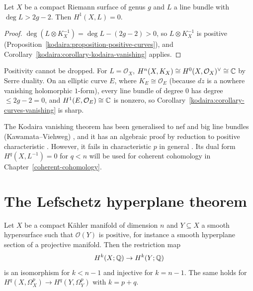 \begin{corollary}\label{kodaira:corollary-curves-vanishing}
Let $X$ be a compact Riemann surface of genus $g$ and $L$ a line bundle with $\deg L > 2g - 2$. Then $H^1(X, L) = 0$.
\end{corollary}

\begin{proof}
$\deg(L \otimes K_X^{-1}) = \deg L - (2g - 2) > 0$, so $L \otimes K_X^{-1}$ is positive (Proposition~\ref{kodaira:proposition-positive-curves}), and
Corollary~\ref{kodaira:corollary-kodaira-vanishing} applies.
\end{proof}

\begin{counterexample}\label{kodaira:counterexample-trivial-bundle}
Positivity cannot be dropped. For $L = \mathcal{O}_X$, $H^n(X, K_X) \cong H^0(X, \mathcal{O}_X)^\vee \cong \mathbb{C}$ by Serre duality. On an
elliptic curve $E$, where $K_E \cong \mathcal{O}_E$ (because $dz$ is a nowhere vanishing holomorphic $1$-form), every line bundle of degree $0$
has degree $\leq 2g - 2 = 0$, and $H^1(E, \mathcal{O}_E) \cong \mathbb{C}$ is nonzero, so Corollary~\ref{kodaira:corollary-curves-vanishing} is sharp.
\end{counterexample}

\begin{remark}\label{kodaira:remark-vanishing-generalisations}
The Kodaira vanishing theorem has been generalised to nef and big line bundles (Kawamata--Viehweg) \cite[Chapter 4]{lazarsfeld-positivity-1},
and it has an algebraic proof by reduction to positive characteristic \cite{deligne-illusie}. However, it fails in characteristic $p$ in
general \cite{raynaud-1978}. Its dual form
$H^q(X, L^{-1}) = 0$ for $q < n$ will be used for coherent cohomology in Chapter~\ref{coherent-cohomology}.
\end{remark}

\section{The Lefschetz hyperplane theorem}\label{kodaira:section-lefschetz-hyperplane}

\begin{theorem}\label{kodaira:theorem-lefschetz-hyperplane}
Let $X$ be a compact K\"ahler manifold of dimension $n$ and $Y \subseteq X$ a smooth hypersurface such that $\mathcal{O}(Y)$ is positive, for
instance a smooth hyperplane section of a projective manifold. Then the restriction map
\[
H^k(X; \mathbb{Q}) \to H^k(Y; \mathbb{Q})
\]
is an isomorphism for $k < n - 1$ and injective for $k = n - 1$. The same holds for $H^q(X, \Omega^p_X) \to H^q(Y, \Omega^p_Y)$ with
$k = p + q$.
\end{theorem}

